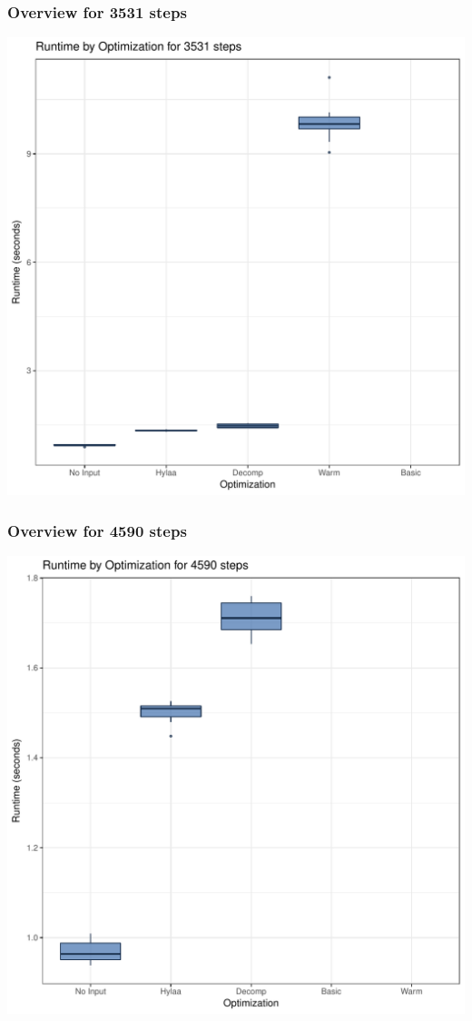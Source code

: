 \documentclass{article}\usepackage[]{graphicx}\usepackage[]{color}
\makeatletter
\def\maxwidth{ %
  \ifdim\Gin@nat@width>\linewidth
    \linewidth
  \else
    \Gin@nat@width
  \fi
}
\newenvironment{knitrout}{}{} %
\makeatother
\begin{document}
\subsubsection{Overview for 3531 steps}
\begin{knitrout}
\color{fgcolor}
\includegraphics[width=\maxwidth]{figure/steps3531-1} 

\end{knitrout}
\subsubsection{Overview for 4590 steps}
\begin{knitrout}
\color{fgcolor}
\includegraphics[width=\maxwidth]{figure/steps4590-1} 

\end{knitrout}
\end{document}
